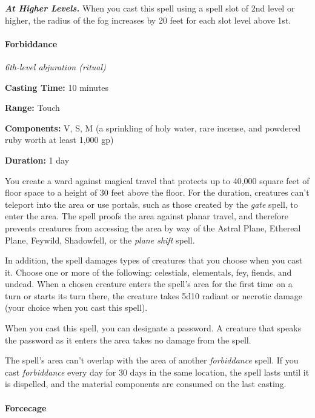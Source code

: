 \documentclass[
]{article}
\begin{document}
\emph{\textbf{At Higher Levels.}} When you cast this spell using a spell
slot of 2nd level or higher, the radius of the fog increases by 20 feet
for each slot level above 1st.

\hypertarget{forbiddance}{%
\paragraph{Forbiddance}\label{forbiddance}}

\emph{6th-level abjuration (ritual)}

\textbf{Casting Time:} 10 minutes

\textbf{Range:} Touch

\textbf{Components:} V, S, M (a sprinkling of holy water, rare incense,
and powdered ruby worth at least 1,000 gp)

\textbf{Duration:} 1 day

You create a ward against magical travel that protects up to 40,000
square feet of floor space to a height of 30 feet above the floor. For
the duration, creatures can't teleport into the area or use portals,
such as those created by the \emph{gate} spell, to enter the area. The
spell proofs the area against planar travel, and therefore prevents
creatures from accessing the area by way of the Astral Plane, Ethereal
Plane, Feywild, Shadowfell, or the \emph{plane shift} spell.

In addition, the spell damages types of creatures that you choose when
you cast it. Choose one or more of the following: celestials,
elementals, fey, fiends, and undead. When a chosen creature enters the
spell's area for the first time on a turn or starts its turn there, the
creature takes 5d10 radiant or necrotic damage (your choice when you
cast this spell).

When you cast this spell, you can designate a password. A creature that
speaks the password as it enters the area takes no damage from the
spell.

The spell's area can't overlap with the area of another
\emph{forbiddance} spell. If you cast \emph{forbiddance} every day for
30 days in the same location, the spell lasts until it is dispelled, and
the material components are consumed on the last casting.

\hypertarget{forcecage}{%
\paragraph{Forcecage}\label{forcecage}}
\end{document}
